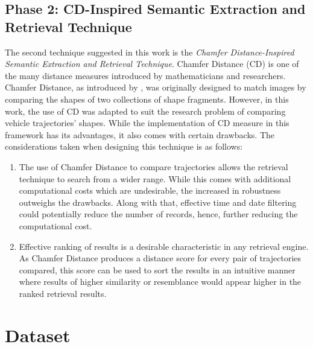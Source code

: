 \subsection{Phase 2: CD-Inspired Semantic Extraction and Retrieval Technique}
The second technique suggested in this work is the \textit{Chamfer Distance-Inspired Semantic Extraction and Retrieval Technique}.
Chamfer Distance (CD) is one of the many distance measures %
introduced by mathematicians and researchers. Chamfer Distance, as introduced by \cite{barrow1977parametric}, was originally designed to match images by comparing the shapes of two collections of shape fragments.
However, in this work, the use of CD was adapted to suit the research problem of comparing vehicle trajectories' shapes. While the implementation of CD measure in this framework has its advantages, it also comes with certain drawbacks. The considerations taken when designing this technique is as follows:
\begin{enumerate}
    \item The use of Chamfer Distance to compare trajectories allows the retrieval technique to search from a wider range. While this comes with additional computational costs which are undesirable, the increased in robustness outweighs the drawbacks. Along with that, effective time and date filtering could potentially reduce the number of records, hence, further reducing the computational cost.
    \item Effective ranking of results is a desirable characteristic in any retrieval engine. As Chamfer Distance produces a distance score for every pair of trajectories compared, this score can be used to sort the results in an intuitive manner where results of higher similarity or resemblance would appear higher in the ranked retrieval results.
\end{enumerate}


\section{Dataset}
\label{section:dataset_used}

